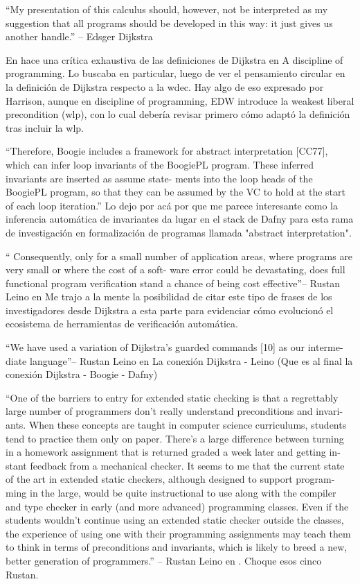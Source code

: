 \documentclass[12pt, a4paper, openany, fleqn]{book}
\begin{document}
    ``My presentation of this calculus should, however, not be interpreted as my suggestion that all programs should be developed in this way: it just gives us another handle.'' -- Edsger Dijkstra \cite{EWD:EWD418}

    En \cite{10.1007/BFb0055136} hace una crítica exhaustiva de las definiciones de Dijkstra en A discipline of programming. Lo buscaba en particular, luego de ver el pensamiento circular en la definición de Dijkstra respecto a la wdec. Hay algo de eso expresado por Harrison, aunque en discipline of programming, EDW introduce la weakest liberal precondition (wlp), con lo cual debería revisar primero cómo adaptó la definición tras incluir la wlp.

    ``Therefore, Boogie includes a
    framework for abstract interpretation [CC77], which can infer loop invariants of
    the BoogiePL program. These inferred invariants are inserted as assume state-
    ments into the loop heads of the BoogiePL program, so that they can be assumed
    by the VC to hold at the start of each loop iteration.''\cite{10.1007/11804192_17}
    Lo dejo por acá por que me parece interesante como la inferencia automática de invariantes da lugar en el stack de Dafny para esta rama de investigación en formalización de programas llamada "abstract interpretation". 

    `` Consequently, only for a small number of
    application areas, where programs are very small or where the cost of a soft-
    ware error could be devastating, does full functional program verification stand
    a chance of being cost effective''-- Rustan Leino en \cite{Leino2001} Me trajo a la mente la posibilidad de citar este tipo de frases de los investigadores desde Dijkstra a esta parte para evidenciar cómo evolucionó el ecosistema de herramientas de verificación automática.

    ``We have used a variation of Dijkstra’s guarded commands [10] as our interme-
    diate language''-- Rustan Leino en \cite{Leino2001} La conexión Dijkstra - Leino (Que es al final la conexión Dijkstra - Boogie - Dafny)


    ``One of the barriers to entry for extended static checking is that a regrettably
    large number of programmers don’t really understand preconditions and invari-
    ants. When these concepts are taught in computer science curriculums, students
    tend to practice them only on paper. There’s a large difference between turning
    in a homework assignment that is returned graded a week later and getting in-
    stant feedback from a mechanical checker. It seems to me that the current state
    of the art in extended static checkers, although designed to support program-
    ming in the large, would be quite instructional to use along with the compiler
    and type checker in early (and more advanced) programming classes. Even if the
    students wouldn’t continue using an extended static checker outside the classes,
    the experience of using one with their programming assignments may teach them
    to think in terms of preconditions and invariants, which is likely to breed a new,
    better generation of programmers.'' -- Rustan Leino en \cite{Leino2001}. Choque esos cinco Rustan.
\end{document}
